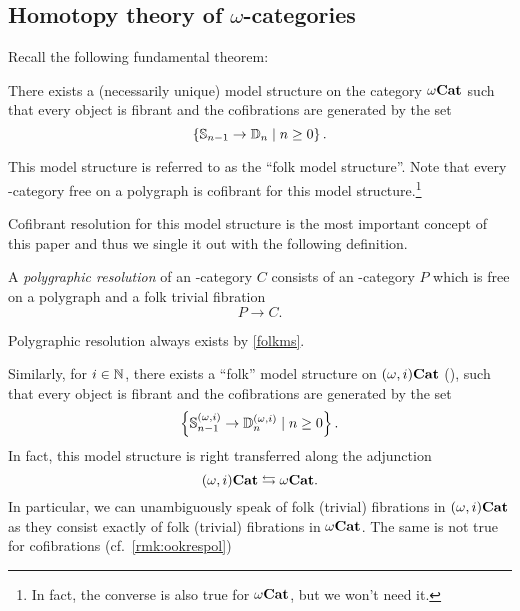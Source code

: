 \documentclass{amsart}
\begin{document}
\subsection{Homotopy theory of $\omega$-categories}
Recall the following fundamental theorem:
\begin{theorem}\label{folkms}
  There exists a (necessarily unique) model structure on the category
  ${\omega}\mathbf{Cat}$ such that  every object is fibrant and the cofibrations are generated by the set
    \[
      \left\{ \mathbb{S}_{n-1} \to \mathbb{D}_{n}\; | \; n\geq 0\right\}.
    \]
  \end{theorem}
  \begin{paragr}
    This model structure is referred to as the ``folk model
    structure''. Note that every \oo\nbd-category free on a polygraph
    is cofibrant for this model structure.\footnote{In fact, the
      converse is also true \cite{} for ${\omega}\mathbf{Cat}$, but we won't need
      it.} 
  \end{paragr}
  Cofibrant resolution for this model structure is the most important
  concept of this paper and thus we single it out with the following definition.
  \begin{definition}
  A \emph{polygraphic resolution} of an \oo\nbd-category $C$
    consists of an \oo\nbd-category $P$ which is free on a polygraph and a
    folk trivial fibration
    \[
      P \to C.
    \]
  \end{definition}
  Polygraphic resolution always exists by \cref{folkms}.
  \begin{paragr}
    Similarly, for $i \in \mathbb N$, there exists a ``folk'' model structure
    on $(\omega,i)\mathbf{Cat}$ (\cite[Theorem 6.19]{aralucas:folmon}), such that every object is fibrant and the
    cofibrations are generated by the set
    \[
      \left\{ \mathbb{S}_{n-1}^{(\omega,i)} \to \mathbb{D}_{n}^{(\omega,i)}\; | \; n \geq 0\right\}.
    \]
    In fact, this model structure is right transferred along the adjunction
    \[
      (\omega,i)\mathbf{Cat} \leftrightarrows {\omega}\mathbf{Cat}.
    \]
    In particular, we can unambiguously speak of folk (trivial)
    fibrations in $(\omega,i)\mathbf{Cat}$ as they consist exactly of folk
    (trivial) fibrations in ${\omega}\mathbf{Cat}$. The same is not true for
    cofibrations (cf.\ \ref{rmk:ookrespol})%
  \end{paragr}
\end{document}
